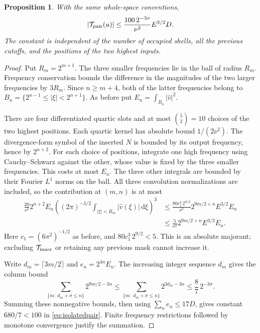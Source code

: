 \documentclass[11pt]{article}
\newtheorem{proposition}{Proposition}
\newcommand{\dd}{\,\mathrm d}
\begin{document}
\begin{proposition}\label{prop:isolatedpair}
With the same whole-space conventions,
\begin{equation}\label{eq:isolatedpair}
 |\mathcal T_{\rm pair}(u)|
 \leq\frac{100\,2^{-3\sigma}}{\nu^2}E^{3/2}D.
\end{equation}
The constant is independent of the number of occupied shells, all the
previous cutoffs, and the positions of the two highest inputs.
\end{proposition}
\begin{proof}
Put $R_m=2^{m+1}$. The three smaller frequencies lie in the ball of
radius $R_m$. Frequency conservation bounds the difference in the
magnitudes of the two larger frequencies by $3R_m$.
Since $n\geq m+4$, both of the latter frequencies belong to
$B_n=\{2^{n-1}\leq|\xi|<2^{n+1}\}$. As before put
$E_n=\int_{B_n}|\widehat v|^2$.

There are four differentiated quartic slots and at most
$\binom52=10$ choices of the two highest positions. Each quartic
kernel has absolute bound $1/(2\nu^2)$. The divergence-form symbol
of the inserted $N$ is bounded by its output frequency, hence by
$2^{n+2}$. For each choice of positions, integrate one high frequency
using Cauchy--Schwarz against the other, whose value is fixed by the
three smaller frequencies. This costs at most $E_n$. The three other
integrals are bounded by their Fourier $L^1$ norms on the ball.
All three convolution normalizations are included, so the contribution
at $(m,n)$ is at most
\begin{align*}
 \frac{20}{\nu^2}2^{n+2}E_n
 \left((2\pi)^{-3/2}\int_{|\xi|<R_m}|\widehat v(\xi)|\dd\xi\right)^3
 &\leq\frac{80c_1^3\,2^{9/2}}{\nu^2}
                 2^{9m/2+n}E^{3/2}E_n\\
 &\leq\frac5{\nu^2}2^{9m/2+n}E^{3/2}E_n.
\end{align*}
Here $c_1=(6\pi^2)^{-1/2}$ as before, and
$80c_1^3\,2^{9/2}<5$. This is an absolute majorant; excluding
$\mathcal T_{\rm inner}$ or retaining any previous mask cannot increase it.

Write $d_m=\lceil3m/2\rceil$ and $e_n=2^{4n}E_n$.
The increasing integer sequence $d_m$ gives the column bound
\[
 \sum_{\{m:\ d_m+\sigma\leq n\}}2^{9m/2-3n}
 \leq\sum_{\{m:\ d_m+\sigma\leq n\}}2^{3d_m-3n}
 \leq\frac87\,2^{-3\sigma}.
\]
Summing these nonnegative bounds, then using
$\sum_n e_n\leq17D$, gives constant $680/7<100$ in
\eqref{eq:isolatedpair}. Finite frequency restrictions followed by
monotone convergence justify the summation.
\end{proof}
\end{document}
